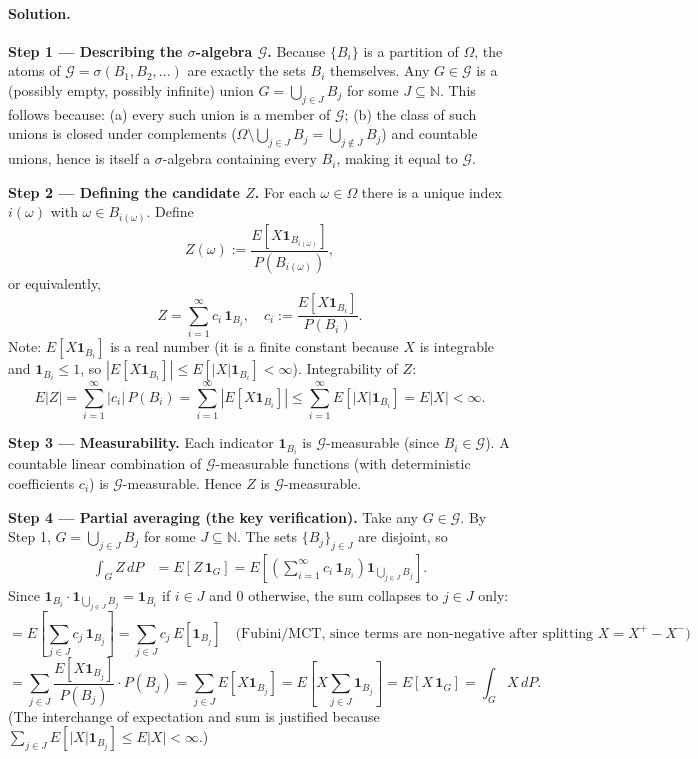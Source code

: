 \documentclass[11pt]{article}
\newcommand{\G}{\mathcal{G}}
\newcommand{\1}{\mathbf{1}}
\theoremstyle{plain}
\begin{document}
\paragraph{Solution.}

\textbf{Step 1 — Describing the $\sigma$-algebra $\G$.}
Because $\{B_i\}$ is a partition of $\Omega$, the atoms of $\G=\sigma(B_1,B_2,\ldots)$
are exactly the sets $B_i$ themselves. Any $G\in\G$ is a (possibly empty, possibly
infinite) union $G=\bigcup_{j\in J}B_j$ for some $J\subseteq\mathbb{N}$. This
follows because: (a) every such union is a member of $\G$; (b) the class of such
unions is closed under complements ($\Omega\setminus\bigcup_{j\in J}B_j
=\bigcup_{j\notin J}B_j$) and countable unions, hence is itself a $\sigma$-algebra
containing every $B_i$, making it equal to $\G$.

\textbf{Step 2 — Defining the candidate $Z$.}
For each $\omega\in\Omega$ there is a unique index $i(\omega)$ with
$\omega\in B_{i(\omega)}$. Define
\[
  Z(\omega) := \frac{E[X\mathbf{1}_{B_{i(\omega)}}]}{P(B_{i(\omega)})},
\]
or equivalently,
\[
  Z = \sum_{i=1}^{\infty} c_i\,\mathbf{1}_{B_i}, \quad
  c_i := \frac{E[X\mathbf{1}_{B_i}]}{P(B_i)}.
\]
Note: $E[X\mathbf{1}_{B_i}]$ is a real number (it is a finite constant because
$X$ is integrable and $\mathbf{1}_{B_i}\le1$, so
$|E[X\mathbf{1}_{B_i}]|\le E[|X|\mathbf{1}_{B_i}]<\infty$). Integrability of $Z$:
\[
  E|Z|
  = \sum_{i=1}^{\infty}|c_i|\,P(B_i)
  = \sum_{i=1}^{\infty}|E[X\mathbf{1}_{B_i}]|
  \le \sum_{i=1}^{\infty}E[|X|\mathbf{1}_{B_i}]
  = E|X| < \infty.
\]

\textbf{Step 3 — Measurability.}
Each indicator $\mathbf{1}_{B_i}$ is $\G$-measurable (since $B_i\in\G$).
A countable linear combination of $\G$-measurable functions (with deterministic
coefficients $c_i$) is $\G$-measurable. Hence $Z$ is $\G$-measurable.

\textbf{Step 4 — Partial averaging (the key verification).}
Take any $G\in\G$. By Step 1, $G=\bigcup_{j\in J}B_j$ for some $J\subseteq\mathbb{N}$.
The sets $\{B_j\}_{j\in J}$ are disjoint, so
\begin{align*}
  \int_G Z\,dP
  &= E[Z\,\mathbf{1}_G]
   = E\!\left[\left(\sum_{i=1}^{\infty}c_i\,\mathbf{1}_{B_i}\right)
              \mathbf{1}_{\bigcup_{j\in J}B_j}\right].
\end{align*}
Since $\mathbf{1}_{B_i}\cdot\mathbf{1}_{\bigcup_{j\in J}B_j}=\mathbf{1}_{B_i}$
if $i\in J$ and $0$ otherwise, the sum collapses to $j\in J$ only:
\[
  = E\!\left[\sum_{j\in J}c_j\,\mathbf{1}_{B_j}\right]
  = \sum_{j\in J}c_j\,E[\mathbf{1}_{B_j}]
  \quad\text{(Fubini/MCT, since terms are non-negative after splitting $X=X^+-X^-$)}
\]
\[
  = \sum_{j\in J}\frac{E[X\mathbf{1}_{B_j}]}{P(B_j)}\cdot P(B_j)
  = \sum_{j\in J}E[X\mathbf{1}_{B_j}]
  = E\!\left[X\sum_{j\in J}\mathbf{1}_{B_j}\right]
  = E[X\,\mathbf{1}_G]
  = \int_G X\,dP.
\]
(The interchange of expectation and sum is justified because
$\sum_{j\in J}E[|X|\mathbf{1}_{B_j}]\le E|X|<\infty$.)
\end{document}
